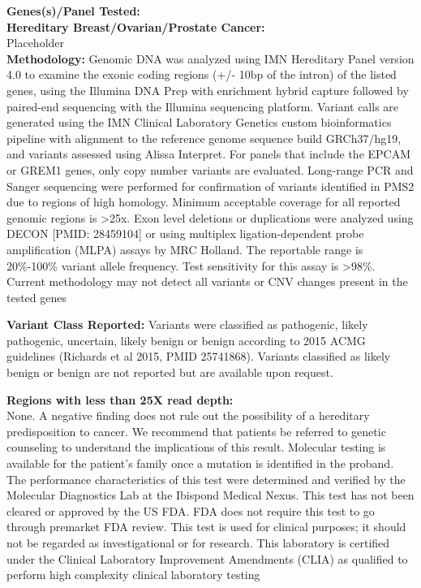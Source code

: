 \documentclass[9pt]{extarticle}
\begin{document}
\begin{flushleft}
{\bf
Genes(s)/Panel Tested:\\
Hereditary Breast/Ovarian/Prostate Cancer: \\}
Placeholder \\
{\bf Methodology: } Genomic DNA was analyzed using IMN Hereditary Panel version 4.0 to examine the exonic coding regions (+/- 10bp of the intron) of the listed genes, using the Illumina DNA Prep with enrichment hybrid capture followed by paired-end sequencing with the Illumina sequencing platform. Variant calls are generated using the IMN Clinical Laboratory Genetics custom bioinformatics pipeline with alignment to the reference genome sequence build GRCh37/hg19, and variants assessed using Alissa Interpret. For panels that include the EPCAM or GREM1 genes, only copy number variants are evaluated. Long-range PCR and Sanger sequencing were performed for confirmation of variants identified in PMS2 due to regions of high homology. Minimum acceptable coverage for all reported genomic regions is >25x. Exon level deletions or duplications were analyzed using DECON [PMID: 28459104] or using multiplex ligation-dependent probe amplification (MLPA) assays by MRC Holland. The reportable range is 20\%-100\% variant allele frequency. Test sensitivity for this assay is >98\%. Current methodology may not detect all variants or CNV changes present in the tested genes

{\bf Variant Class Reported: } Variants were classified as pathogenic, likely pathogenic, uncertain, likely benign or benign according to 2015 ACMG guidelines (Richards et al 2015, PMID 25741868). Variants classified as likely benign or benign are not reported but are available upon request. 

{\bf Regions with less than 25X read depth: \\}
None. 
\newline
\newline
A negative finding does not rule out the possibility of a hereditary predisposition to cancer. We recommend that patients be referred to genetic counseling to understand the implications of this result. Molecular testing is available for the patient's family once a mutation is identified in the proband. 
\newline
\newline
The performance characteristics of this test were determined and verified by the Molecular Diagnostics Lab at the Ibispond Medical Nexus. This test has not been cleared or approved by the US FDA. FDA does not require this test to go through premarket FDA review. This test is used for clinical purposes; it should not be regarded as investigational or for research. This laboratory is certified under the Clinical Laboratory Improvement Amendments (CLIA) as qualified to perform high complexity clinical laboratory testing
\end{flushleft}
\end{document}
